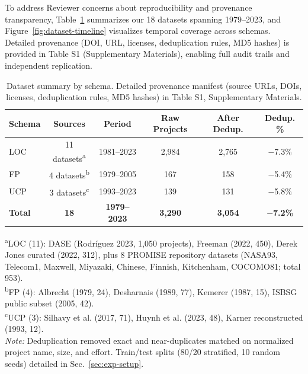 \documentclass{ieeeaccess}
\begin{document}
To address Reviewer concerns about reproducibility and provenance transparency, Table~\ref{tab:dataset-summary} summarizes our 18 datasets spanning 1979--2023, and Figure~\ref{fig:dataset-timeline} visualizes temporal coverage across schemas. Detailed provenance (DOI, URL, licenses, deduplication rules, MD5 hashes) is provided in Table S1 (Supplementary Materials), enabling full audit trails and independent replication.

\begin{table}[h]
\centering
\caption{Dataset summary by schema. Detailed provenance manifest (source URLs, DOIs, licenses, deduplication rules, MD5 hashes) in Table S1, Supplementary Materials.}
\label{tab:dataset-summary}
\small
\begin{tabular}{l c c c c c}
\toprule
\textbf{Schema} & \textbf{Sources} & \textbf{Period} & \textbf{Raw Projects} & \textbf{After Dedup.} & \textbf{Dedup. \%} \\
\midrule
LOC & 11 datasets\textsuperscript{a} & 1981--2023 & 2,984 & 2,765 & $-$7.3\% \\
FP  & 4 datasets\textsuperscript{b}  & 1979--2005 & 167   & 158   & $-$5.4\% \\
UCP & 3 datasets\textsuperscript{c}  & 1993--2023 & 139   & 131   & $-$5.8\% \\
\midrule
\textbf{Total} & \textbf{18} & \textbf{1979--2023} & \textbf{3,290} & \textbf{3,054} & \textbf{$-$7.2\%} \\
\bottomrule
\end{tabular}
\vspace{0.3em}
\raggedright\footnotesize
\textsuperscript{a}LOC (11): DASE (Rodríguez 2023, 1,050 projects), Freeman (2022, 450), Derek Jones curated (2022, 312), plus 8 PROMISE repository datasets (NASA93, Telecom1, Maxwell, Miyazaki, Chinese, Finnish, Kitchenham, COCOMO81; total 953). \\
\textsuperscript{b}FP (4): Albrecht (1979, 24), Desharnais (1989, 77), Kemerer (1987, 15), ISBSG public subset (2005, 42). \\
\textsuperscript{c}UCP (3): Silhavy et al. (2017, 71), Huynh et al. (2023, 48), Karner reconstructed (1993, 12). \\
\textit{Note:} Deduplication removed exact and near-duplicates matched on normalized project name, size, and effort. Train/test splits (80/20 stratified, 10 random seeds) detailed in Sec.~\ref{sec:exp-setup}.
\end{table}
\end{document}
